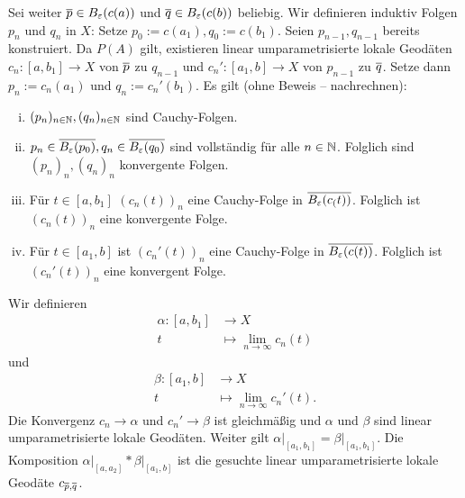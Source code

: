 \begin{beweis}
\begin{enumerate}[(1)]
		Sei weiter $\overline{p} \in B_\varepsilon(c(a))$ und $\overline{q} \in B_\varepsilon(c(b))$ beliebig.
		Wir definieren induktiv Folgen $p_n$ und $q_n$ in $X$:
		Setze $p_0 := c(a_1), q_0 := c(b_1)$.
		Seien $p_{n-1}, q_{n-1}$ bereits konstruiert.
		Da $P(A)$ gilt, existieren linear umparametrisierte lokale Geodäten $c_n \colon [a, b_1] \rightarrow X$ von $\overline{p}$ zu $q_{n-1}$ und $c_n' \colon [a_1,b] \rightarrow X$ von $p_{n-1}$ zu $\overline{q}$.
		Setze dann $p_n := c_n(a_1)$ und $q_n := c_n'(b_1)$. Es gilt (ohne Beweis -- nachrechnen):
		\begin{enumerate}[(i)]
			\item $(p_n)_{n \in \mathbb{N}}, (q_n)_{n \in \mathbb{N}}$ sind Cauchy-Folgen.
			\item $p_n \in \overline{B_\varepsilon(p_0)}, q_n \in \overline{B_\varepsilon(q_0)}$ sind vollständig für alle $n \in \mathbb{N}$.
			Folglich sind $(p_n)_n, (q_n)_n$ konvergente Folgen.
			\item Für $t \in [a,b_1]$ $(c_n(t))_n$ eine Cauchy-Folge in $\overline{B_\varepsilon(c_(t))}$.
			Folglich ist $(c_n(t))_n$ eine konvergente Folge.
			\item Für $t \in [a_1,b]$ ist $(c_n'(t))_n$ eine Cauchy-Folge in $\overline{B_\varepsilon(c(t))}$.
			Folglich ist $(c_n'(t))_n$ eine konvergent Folge.
		\end{enumerate}
		Wir definieren
		\begin{align*}
			\alpha \colon [a,b_1] &\longrightarrow X \\
			t &\longmapsto \lim\limits_{n \rightarrow \infty} c_n(t)
		\end{align*}
		und
		\begin{align*}
			\beta \colon [a_1,b] &\longrightarrow X \\
			t &\longmapsto \lim\limits_{n \rightarrow \infty} c_n'(t).
		\end{align*}
		Die Konvergenz $c_n \rightarrow \alpha$ und $c_n' \rightarrow \beta$ ist gleichmäßig und $\alpha$ und $\beta$ sind linear umparametrisierte lokale Geodäten.
		Weiter gilt $\alpha \big|_{[a_1,b_1]} = \beta \big|_{[a_1,b_1]}$.
		Die Komposition $\alpha\big|_{[a,a_2]} * \beta \big|_{[a_1,b]}$ ist die gesuchte linear umparametrisierte lokale Geodäte $c_{\overline{p},\overline{q}}$. \qedhere
	\end{enumerate}
\end{beweis}


\cleardoubleoddemptypage